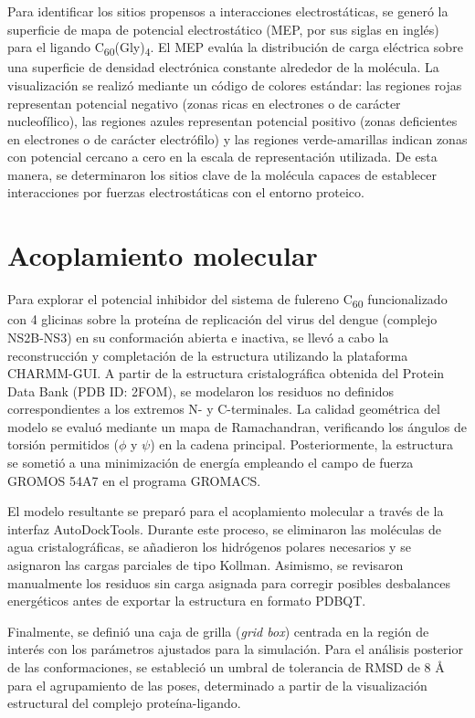 Para identificar los sitios propensos a interacciones electrostáticas, se generó la superficie de mapa de potencial electrostático (MEP, por sus siglas en inglés) para el ligando C\textsubscript{60}(Gly)\textsubscript{4}. El MEP evalúa la distribución de carga eléctrica sobre una superficie de densidad electrónica constante alrededor de la molécula. La visualización se realizó mediante un código de colores estándar: las regiones rojas representan potencial negativo (zonas ricas en electrones o de carácter nucleofílico), las regiones azules representan potencial positivo (zonas deficientes en electrones o de carácter electrófilo) y las regiones verde-amarillas indican zonas con potencial cercano a cero en la escala de representación utilizada. De esta manera, se determinaron los sitios clave de la molécula capaces de establecer interacciones por fuerzas electrostáticas con el entorno proteico.

\section{Acoplamiento molecular}
Para explorar el potencial inhibidor del sistema de fulereno C\textsubscript{60} funcionalizado con 4 glicinas sobre la proteína de replicación del virus del dengue (complejo NS2B-NS3) en su conformación abierta e inactiva, se llevó a cabo la reconstrucción y completación de la estructura utilizando la plataforma CHARMM-GUI. A partir de la estructura cristalográfica obtenida del Protein Data Bank (PDB ID: 2FOM), se modelaron los residuos no definidos correspondientes a los extremos N- y C-terminales. La calidad geométrica del modelo se evaluó mediante un mapa de Ramachandran, verificando los ángulos de torsión permitidos ($\phi$ y $\psi$) en la cadena principal. Posteriormente, la estructura se sometió a una minimización de energía empleando el campo de fuerza GROMOS 54A7 en el programa GROMACS.

El modelo resultante se preparó para el acoplamiento molecular a través de la interfaz AutoDockTools. Durante este proceso, se eliminaron las moléculas de agua cristalográficas, se añadieron los hidrógenos polares necesarios y se asignaron las cargas parciales de tipo Kollman. Asimismo, se revisaron manualmente los residuos sin carga asignada para corregir posibles desbalances energéticos antes de exportar la estructura en formato PDBQT.

Finalmente, se definió una caja de grilla (\textit{grid box}) centrada en la región de interés con los parámetros ajustados para la simulación. Para el análisis posterior de las conformaciones, se estableció un umbral de tolerancia de RMSD de 8 Å para el agrupamiento de las poses, determinado a partir de la visualización estructural del complejo proteína-ligando.
